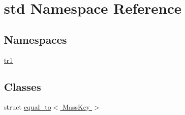 \hypertarget{namespacestd}{\section{std Namespace Reference}
\label{namespacestd}
}
\subsection*{Namespaces}
\begin{DoxyCompactItemize}
\item 
\hyperlink{namespacestd_1_1tr1}{tr1}
\end{DoxyCompactItemize}
\subsection*{Classes}
\begin{DoxyCompactItemize}
\item 
struct \hyperlink{structstd_1_1equal__to_3_01MassKey_01_4}{equal\-\_\-to$<$ Mass\-Key $>$}
\end{DoxyCompactItemize}
